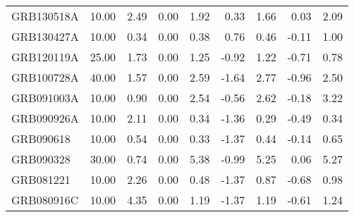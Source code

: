\begin{tabular}{lrrrrrrrr}
GRB130518A & 10.00 & 2.49 & 0.00 & 1.92 & 0.33 & 1.66 & 0.03 & 2.09 \\
GRB130427A & 10.00 & 0.34 & 0.00 & 0.38 & 0.76 & 0.46 & -0.11 & 1.00 \\
GRB120119A & 25.00 & 1.73 & 0.00 & 1.25 & -0.92 & 1.22 & -0.71 & 0.78 \\
GRB100728A & 40.00 & 1.57 & 0.00 & 2.59 & -1.64 & 2.77 & -0.96 & 2.50 \\
GRB091003A & 10.00 & 0.90 & 0.00 & 2.54 & -0.56 & 2.62 & -0.18 & 3.22 \\
GRB090926A & 10.00 & 2.11 & 0.00 & 0.34 & -1.36 & 0.29 & -0.49 & 0.34 \\
GRB090618 & 10.00 & 0.54 & 0.00 & 0.33 & -1.37 & 0.44 & -0.14 & 0.65 \\
GRB090328 & 30.00 & 0.74 & 0.00 & 5.38 & -0.99 & 5.25 & 0.06 & 5.27 \\
GRB081221 & 10.00 & 2.26 & 0.00 & 0.48 & -1.37 & 0.87 & -0.68 & 0.98 \\
GRB080916C & 10.00 & 4.35 & 0.00 & 1.19 & -1.37 & 1.19 & -0.61 & 1.24 \\
\bottomrule
\end{tabular}
